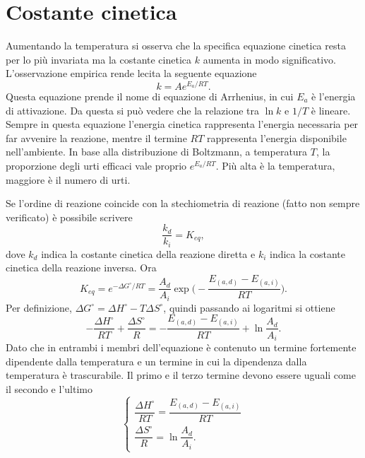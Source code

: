 \section{Costante cinetica}
Aumentando la temperatura si osserva che la specifica equazione cinetica resta per lo più invariata ma la costante cinetica $k$ aumenta in modo significativo. L'osservazione empirica rende lecita la seguente equazione
\begin{equation}
    k=Ae^{E_a/RT}.
\end{equation}
Questa equazione prende il nome di equazione di Arrhenius, in cui $E_a$ è l'energia di attivazione. Da questa si può vedere che la relazione tra $\ln{k}$ e $1/T$ è lineare. Sempre in questa equazione l'energia cinetica rappresenta l'energia necessaria per far avvenire la reazione, mentre il termine $RT$ rappresenta l'energia disponibile nell'ambiente. In base alla distribuzione di Boltzmann, a temperatura $T$, la proporzione degli urti efficaci vale proprio $e^{E_a/RT}$. Più alta è la temperatura, maggiore è il numero di urti.

Se l'ordine di reazione coincide con la stechiometria di reazione (fatto non sempre verificato) è possibile scrivere
\begin{equation}
    \frac{k_d}{k_i}=K_{eq},
\end{equation}
dove $k_d$ indica la costante cinetica della reazione diretta e $k_i$ indica la costante cinetica della reazione inversa. Ora 
\begin{equation}
    K_{eq}=e^{-\Delta G^\circ/RT}=\frac{A_d}{A_i}\exp{\bigg(-\frac{E_{(a,d)}-E_{(a,i)}}{RT}\bigg)}.
\end{equation}
Per definizione, $\Delta G^\circ=\Delta H^\circ-T\Delta S^\circ$, quindi passando ai logaritmi si ottiene
\begin{equation}\label{eq:entalp.+entrop.}
    -\frac{\Delta H^\circ}{RT}+\frac{\Delta S^\circ}{R}=-\frac{E_{(a,d)}-E_{(a,i)}}{RT}+\ln{\frac{A_d}{A_i}}.
\end{equation}
Dato che in entrambi i membri dell'equazione è contenuto un termine fortemente dipendente dalla temperatura e un termine in cui la dipendenza dalla temperatura è trascurabile. Il primo e il terzo termine devono essere uguali come il secondo e l'ultimo
\begin{equation}\label{eq:sistema entalp. entrop.}
    \begin{cases}
        \dfrac{\Delta H^\circ}{RT}=\dfrac{E_{(a,d)}-E_{(a,i)}}{RT} \\[2ex]
        \dfrac{\Delta S^\circ}{R}=\ln{\dfrac{A_d}{A_i}}.
    \end{cases}
\end{equation}

